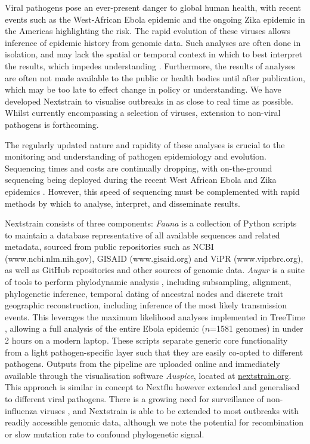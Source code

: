 \documentclass{bioinfo}
\begin{document}
\maketitle

Viral pathogens pose an ever-present danger to global human health, with recent events such as the West-African Ebola epidemic and the ongoing Zika epidemic in the Americas highlighting the risk.
The rapid evolution of these viruses allows inference of epidemic history from genomic data.
Such analyses are often done in isolation, and may lack the spatial or temporal context in which to best interpret the results, which impedes understanding \citep{pybus2013evolutionary}.
Furthermore, the results of analyses are often not made available to the public or health bodies until after publication, which may be too late to effect change in policy or understanding.
We have developed Nextstrain to visualise outbreaks in as close to real time as possible.
Whilst currently encompassing a selection of viruses, extension to non-viral pathogens is forthcoming.

The regularly updated nature and rapidity of these analyses is crucial to the monitoring and understanding of pathogen epidemiology and evolution.
Sequencing times and costs are continually dropping, with on-the-ground sequencing being deployed during the recent West African Ebola and Zika epidemics \citep{quick2016real,faria2017epidemic}.
However, this speed of sequencing must be complemented with rapid methods by which to analyse, interpret, and disseminate results.

Nextstrain consists of three components:
\textit{Fauna} is a collection of Python scripts to maintain a database representative of all available sequences and related metadata, sourced from public repositories such as NCBI (www.ncbi.nlm.nih.gov), GISAID (www.gisaid.org) and ViPR (www.viprbrc.org), as well as GitHub repositories and other sources of genomic data.
\textit{Augur} is a suite of tools to perform phylodynamic analysis \citep{voltz2013}, including subsampling, alignment, phylogenetic inference, temporal dating of ancestral nodes and discrete trait geographic reconstruction, including inference of the most likely transmission events.
This leverages the maximum likelihood analyses implemented in TreeTime \citep{sagulenko2017treetime}, allowing a full analysis of the entire Ebola epidemic ($n$=1581 genomes) in under 2 hours on a modern laptop.
These scripts separate generic core functionality from a light pathogen-specific layer such that they are easily co-opted to different pathogens.
Outputs from the pipeline are uploaded online and immediately available through the visualisation software \textit{Auspice}, located at \href{http://nextstrain.org}{nextstrain.org}.
This approach is similar in concept to Nextflu \citep{neher2015nextflu} however extended and generalised to different viral pathogens.
There is a growing need for surveillance of non-influenza viruses \citep{tang2017global}, and Nextstrain is able to be extended to most outbreaks with readily accessible genomic data, although we note the potential for recombination or slow mutation rate to confound phylogenetic signal.
\end{document}
